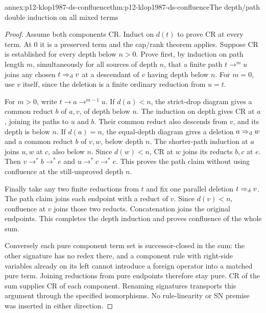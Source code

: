 \begin{annexitem}{annex:p12-klop1987-ds-confluence}{thm:p12-klop1987-ds-confluence}{The depth/path double induction on all mixed terms}
\begin{proof}
Assume both components CR. Induct on \(d(t)\) to prove CR at
every term. At 0 it is a preserved term and the cap/rank theorem
applies. Suppose CR is established for every depth below \(n>0\).
Prove first, by induction on path length \(m\), simultaneously
for all sources of depth \(n\), that a finite path
\(t\to^m u\) joins any chosen \(t\Rightarrow_{\rm d}v\)
at a descendant of \(v\) having depth below \(n\).
For \(m=0\), use \(v\) itself, since the deletion is a finite
ordinary reduction from \(u=t\).

For \(m>0\), write \(t\to a\to^{m-1}u\).
If \(d(a)<n\), the strict-drop diagram gives a common reduct
\(b\) of \(a,v\), of depth below \(n\).
The induction on depth gives CR at \(a\), joining its paths
to \(u\) and \(b\). Their common reduct also descends from
\(v\), and its depth is below \(n\).
If \(d(a)=n\), the equal-depth diagram gives a deletion
\(a\Rightarrow_{\rm d}w\) and a common reduct \(b\) of
\(v,w\), below depth \(n\). The shorter-path induction at
\(a\) joins \(u,w\) at \(c\), also below \(n\).
Since \(d(w)<n\), CR at \(w\) joins its reducts \(b,c\)
at \(e\). Then \(v\to^*b\to^*e\) and
\(u\to^*c\to^*e\). This proves the path claim without
using confluence at the still-unproved depth \(n\).

Finally take any two finite reductions from \(t\) and fix one
parallel deletion \(t\Rightarrow_{\rm d}v\).
The path claim joins each endpoint with a reduct of \(v\).
Since \(d(v)<n\), confluence at \(v\) joins those two reducts.
Concatenation joins the original endpoints. This completes the
depth induction and proves confluence of the whole sum.

Conversely each pure component term set is successor-closed in
the sum: the other signature has no redex there, and a component
rule with right-side variables already on its left cannot introduce
a foreign operator into a matched pure term. Joining reductions
from pure endpoints therefore stay pure. CR of the sum supplies
CR of each component. Renaming signatures transports this argument
through the specified isomorphisms. No rule-linearity or SN premise
was inserted in either direction.
\end{proof}
\end{annexitem}

